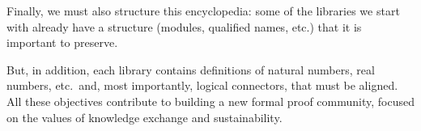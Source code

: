 Finally, we must also structure this encyclopedia: some of the
libraries we start with already have a structure (modules, qualified
names, etc.) that it is important to preserve.

But, in addition, each library contains definitions of natural
numbers, real numbers, etc.\ and, most importantly, logical connectors,
that must be aligned.  All these objectives contribute to building a
new formal proof community, focused on the values of knowledge
exchange and sustainability.


